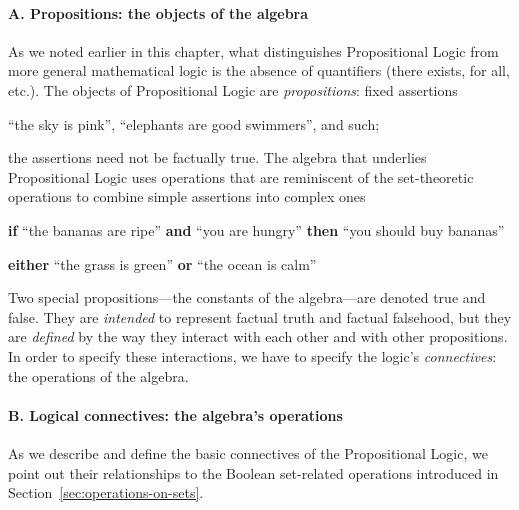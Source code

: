 \paragraph{A. Propositions: the objects of the algebra}

\noindent
As we noted earlier in this chapter, what distinguishes Propositional Logic from more general mathematical logic is the absence of quantifiers ({\sc there exists}, {\sc for all}, etc.).  The objects of Propositional Logic are {\it propositions}: fixed assertions

\smallskip

``the sky is pink'', ``elephants are good swimmers'', and such;

\smallskip

\noindent 
the assertions need not be factually true.  The algebra that underlies Propositional Logic uses operations that are reminiscent of the set-theoretic operations to combine simple assertions into complex ones

\smallskip

{\bf if} ``the bananas are ripe'' {\bf and} ``you are hungry'' {\bf then} ``you should buy bananas''

\smallskip

{\bf either} ``the grass is green'' {\bf or} ``the ocean is calm''

\smallskip

\noindent
Two special propositions---the constants of the algebra---are denoted {\sc true} and {\sc false}.  They are {\em intended} to represent factual truth and factual falsehood, but they are {\em defined} by the way they interact with each other and with other propositions.  In order
to specify these interactions, we have to specify the logic's {\it connectives}: the operations of the algebra.

\bigskip

\paragraph{B. Logical connectives: the algebra's operations}

\noindent
As we describe and define the basic connectives of the Propositional Logic, we point out their relationships to the Boolean set-related operations introduced in Section~\ref{sec:operations-on-sets}.

